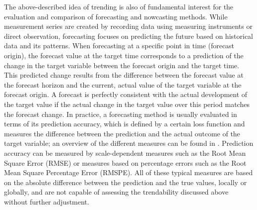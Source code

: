 The above-described idea of trending is also of fundamental interest for the evaluation and comparison of forecasting and nowcasting methods. 
While measurement series are created by recording data using measuring instruments or direct observation, forecasting focuses on predicting the future based on historical data and its patterns. 
When forecasting at a specific point in time (forecast origin), the forecast value at the target time corresponds to a prediction of the change in the target variable between the forecast origin and the target time. 
This predicted change results from the difference between the forecast value at the forecast horizon and the current, actual value of the target variable at the forecast origin. 
A forecast is perfectly consistent with the actual development of the target value if the actual change in the target value over this period matches the forecast change. 
In practice, a forecasting method is usually evaluated in terms of its prediction accuracy, which is defined by a certain loss function and measures the difference between the prediction and the actual outcome of the target variable; an overview of the different measures can be found in \cite{hyndman2006another}. 
Prediction accuracy can be measured by scale-dependent measures such as the Root Mean Square Error (RMSE) or measures based on percentage errors such as the Root Mean Square Percentage Error (RMSPE). 
All of these typical measures are based on the absolute difference between the prediction and the true values, locally or globally, and are not capable of assessing the trendability discussed above without further adjustment.

